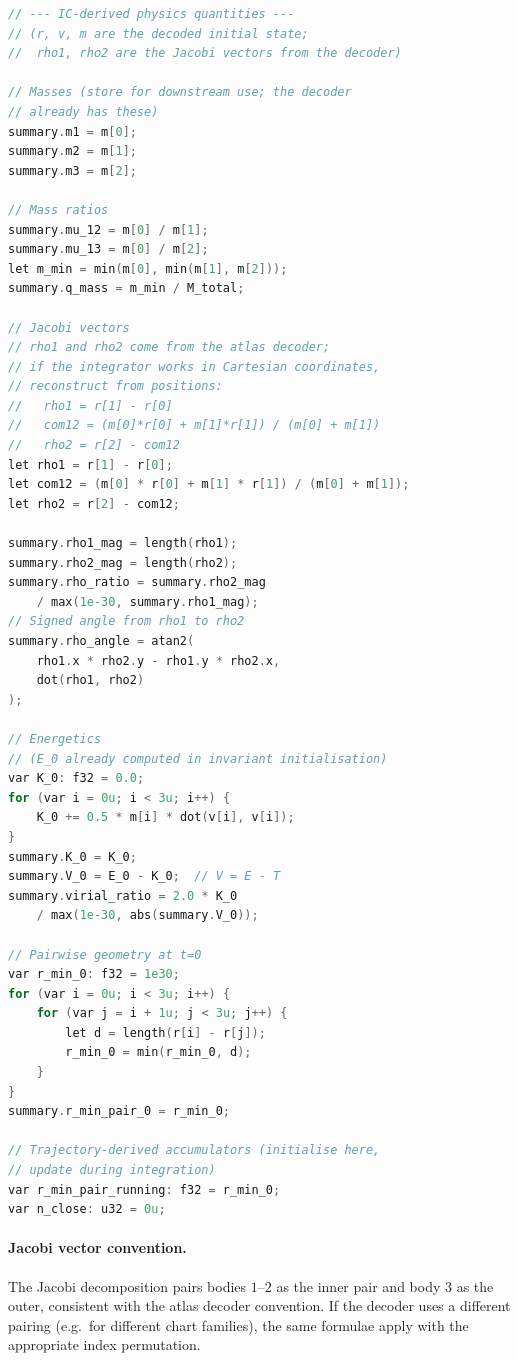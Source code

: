\documentclass[11pt]{article}
\begin{document}
\begin{lstlisting}[language=C]
// --- IC-derived physics quantities ---
// (r, v, m are the decoded initial state;
//  rho1, rho2 are the Jacobi vectors from the decoder)

// Masses (store for downstream use; the decoder
// already has these)
summary.m1 = m[0];
summary.m2 = m[1];
summary.m3 = m[2];

// Mass ratios
summary.mu_12 = m[0] / m[1];
summary.mu_13 = m[0] / m[2];
let m_min = min(m[0], min(m[1], m[2]));
summary.q_mass = m_min / M_total;

// Jacobi vectors
// rho1 and rho2 come from the atlas decoder;
// if the integrator works in Cartesian coordinates,
// reconstruct from positions:
//   rho1 = r[1] - r[0]
//   com12 = (m[0]*r[0] + m[1]*r[1]) / (m[0] + m[1])
//   rho2 = r[2] - com12
let rho1 = r[1] - r[0];
let com12 = (m[0] * r[0] + m[1] * r[1]) / (m[0] + m[1]);
let rho2 = r[2] - com12;

summary.rho1_mag = length(rho1);
summary.rho2_mag = length(rho2);
summary.rho_ratio = summary.rho2_mag
    / max(1e-30, summary.rho1_mag);
// Signed angle from rho1 to rho2
summary.rho_angle = atan2(
    rho1.x * rho2.y - rho1.y * rho2.x,
    dot(rho1, rho2)
);

// Energetics
// (E_0 already computed in invariant initialisation)
var K_0: f32 = 0.0;
for (var i = 0u; i < 3u; i++) {
    K_0 += 0.5 * m[i] * dot(v[i], v[i]);
}
summary.K_0 = K_0;
summary.V_0 = E_0 - K_0;  // V = E - T
summary.virial_ratio = 2.0 * K_0
    / max(1e-30, abs(summary.V_0));

// Pairwise geometry at t=0
var r_min_0: f32 = 1e30;
for (var i = 0u; i < 3u; i++) {
    for (var j = i + 1u; j < 3u; j++) {
        let d = length(r[i] - r[j]);
        r_min_0 = min(r_min_0, d);
    }
}
summary.r_min_pair_0 = r_min_0;

// Trajectory-derived accumulators (initialise here,
// update during integration)
var r_min_pair_running: f32 = r_min_0;
var n_close: u32 = 0u;
\end{lstlisting}

\paragraph{Jacobi vector convention.} The Jacobi decomposition pairs bodies
$1$--$2$ as the inner pair and body $3$ as the outer, consistent with the atlas
decoder convention. If the decoder uses a different pairing (e.g.\ for
different chart families), the same formulae apply with the appropriate index
permutation.
\end{document}
